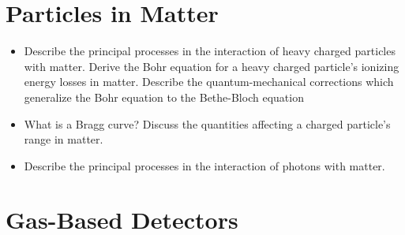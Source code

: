 



\tableofcontents

\section{Particles in Matter}
\begin{itemize}

    \item Describe the principal processes in the interaction of heavy charged particles with matter.
    Derive the Bohr equation for a heavy charged particle's ionizing energy losses in matter.
    Describe the quantum-mechanical corrections which generalize the Bohr equation to the Bethe-Bloch equation

    \item What is a Bragg curve? 
    Discuss the quantities affecting a charged particle's range in matter.

    \item Describe the principal processes in the interaction of photons with matter.

\end{itemize}

\section{Gas-Based Detectors}

